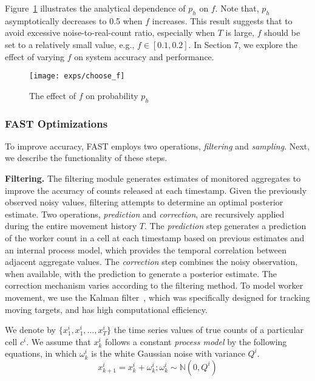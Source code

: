 \documentclass{USC-Thesis}
\numberwithin{equation}{chapter}
\begin{document}
Figure~\ref{fig:choose_f} illustrates the analytical dependence of $p_h$ on $f$. Note that, $p_h$ asymptotically decreases to 0.5 when $f$ increases. This result suggests that to avoid excessive noise-to-real-count ratio, especially when $T$ is large, $f$ should be set to a relatively small value, e.g., $f \in [0.1,0.2]$. In Section 7, we explore the effect of varying $f$ on system accuracy and performance.

\begin{figure}[!htb]\centering
  \texttt{[image: exps/choose\_f]}
  \caption{The effect of $f$ on probability $p_h$}
  \label{fig:choose_f}
\end{figure}

\subsubsection{FAST Optimizations}

To improve accuracy, FAST employs two operations, {\em filtering} and {\em sampling}. Next, we describe the functionality of these steps.

\noindent
\textbf{Filtering.}
The filtering module generates estimates of monitored aggregates to improve the accuracy of counts released at each timestamp. Given the previously observed noisy values, filtering attempts to determine an optimal posterior estimate.  Two operations, \textit{prediction} and \textit{correction}, are recursively applied during the entire movement history $T$.   The \textit{prediction} step generates a prediction of the worker count in a cell at each timestamp based on previous estimates and an internal process model, which provides the temporal correlation between adjacent aggregate values.  The \textit{correction} step combines the noisy observation, when available, with the prediction to generate a posterior estimate.  The correction mechanism varies according to the filtering method. To model worker movement, we use the Kalman filter~\cite{KALMAN60}, which was specifically designed for tracking moving targets, and has high computational efficiency.

We denote by $\{x_1^i,x_1^i,...,x_T^i\}$ the time series values of true counts of a particular cell $c^i$. We assume that $x_k^i$ follows a constant \textit{process model} by the following equations, in which $\omega^i_k$ is the white Gaussian noise with variance $Q^i$.
\begin{equation}
x_{k+1}^i = x_k^i + \omega^i_k ; \omega^i_k \sim  \mathbb{N}(0, Q^i)
\label{eq:linear_model}
\end{equation}
\end{document}
